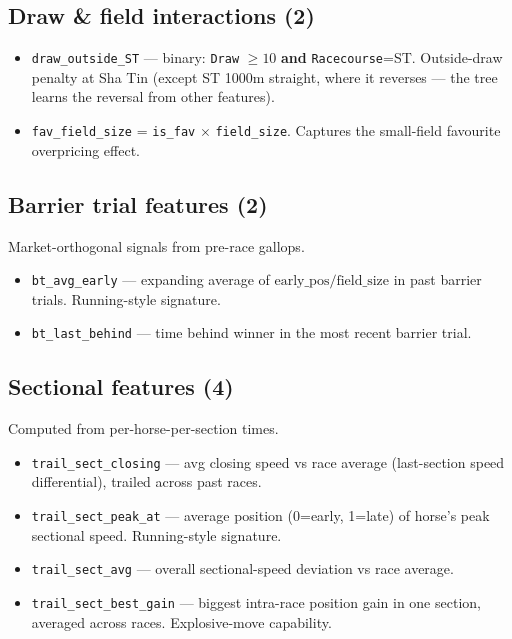 \documentclass[11pt]{article}
\begin{document}
\subsection{Draw \& field interactions (2)}
\begin{itemize}\item \texttt{draw\_outside\_ST} --- binary: \texttt{Draw} $\geq 10$ \textbf{and} \texttt{Racecourse}=ST.
      Outside-draw penalty at Sha Tin (except ST 1000m straight, where it
      reverses --- the tree learns the reversal from other features).
\item \texttt{fav\_field\_size} = \texttt{is\_fav} $\times$ \texttt{field\_size}.
      Captures the small-field favourite overpricing effect.
\end{itemize}

\subsection{Barrier trial features (2)}
Market-orthogonal signals from pre-race gallops.
\begin{itemize}\item \texttt{bt\_avg\_early} --- expanding average of
      $\text{early\_pos}/\text{field\_size}$ in past barrier trials. Running-style signature.
\item \texttt{bt\_last\_behind} --- time behind winner in the most recent
      barrier trial.
\end{itemize}

\subsection{Sectional features (4)}
Computed from per-horse-per-section times.
\begin{itemize}\item \texttt{trail\_sect\_closing} --- avg closing speed vs race average
      (last-section speed differential), trailed across past races.
\item \texttt{trail\_sect\_peak\_at} --- average position (0=early, 1=late)
      of horse's peak sectional speed. Running-style signature.
\item \texttt{trail\_sect\_avg} --- overall sectional-speed deviation vs
      race average.
\item \texttt{trail\_sect\_best\_gain} --- biggest intra-race position gain
      in one section, averaged across races. Explosive-move capability.
\end{itemize}
\end{document}
